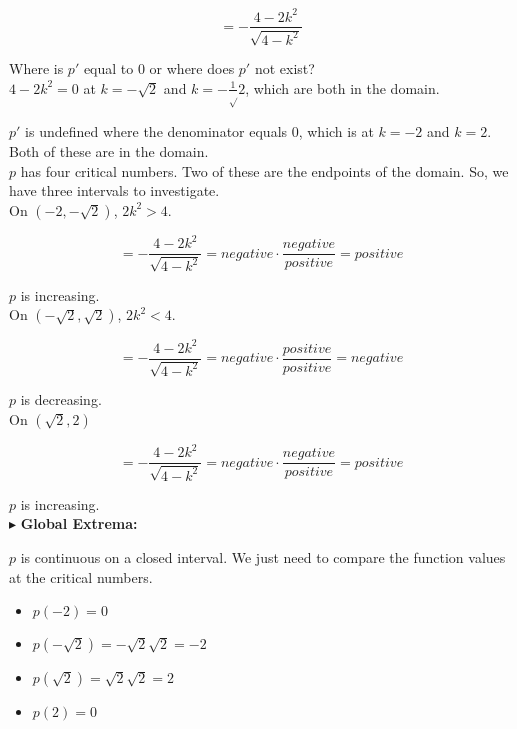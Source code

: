 \documentclass{ximera}
\begin{document}
\begin{example}
\[
= - \frac{4-2k^2}{\sqrt{4-k^2}} 
\]


Where is $p'$ equal to $0$ or where does $p'$ not exist? \\



$4-2k^2 = 0$ at $k = -\sqrt{2}$ and $k = -\frac{1}\sqrt{2}$, which are both in the domain.

$p'$ is undefined where the denominator equals $0$, which is at $k=-2$ and $k=2$.  Both of these are in the domain. \\



$p$ has four critical numbers.  Two of these are the endpoints of the domain. So, we have three intervals to investigate. \\



On $\left( -2, -\sqrt{2} \right)$, $2k^2 > 4$.


\[
= - \frac{4-2k^2}{\sqrt{4-k^2}} = negative \cdot \frac{negative}{positive} = positive
\]


$p$ is increasing.\\



On $\left( -\sqrt{2}, \sqrt{2} \right)$, $2k^2 < 4$.


\[
= - \frac{4-2k^2}{\sqrt{4-k^2}} = negative \cdot \frac{positive}{positive} = negative
\]


$p$ is decreasing.\\



On $\left( \sqrt{2}, 2 \right)$


\[
= - \frac{4-2k^2}{\sqrt{4-k^2}} = negative \cdot \frac{negative}{positive} = positive
\]


$p$ is increasing.\\



















$\blacktriangleright$ \textbf{\textcolor{blue!55!black}{Global Extrema:}}  


$p$ is continuous on a closed interval.  We just need to compare the function values at the critical numbers.


\begin{itemize}
  \item $p(-2) = 0$
  \item $p(-\sqrt{2}) = -\sqrt{2}\sqrt{2} = -2$
  \item $p(\sqrt{2}) = \sqrt{2}\sqrt{2} = 2$
  \item $p(2) = 0$
\end{itemize}



\end{example}
\end{document}
